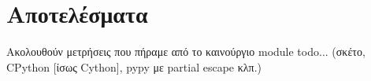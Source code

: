 
\chapter{Αποτελέσματα}
\label{chapter5}

Ακολουθούν μετρήσεις που πήραμε από το καινούργιο module todo...
(σκέτο, CPython [ίσως Cython], pypy με partial escape κλπ.)

